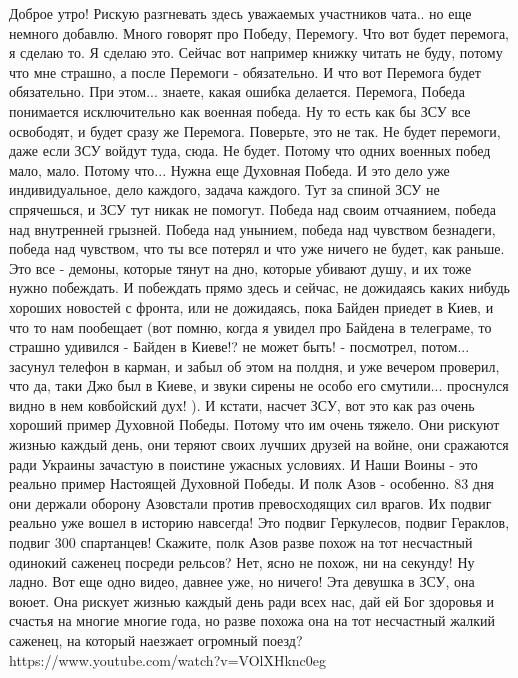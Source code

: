 Доброе утро! Рискую разгневать здесь уважаемых участников чата.. но еще немного
добавлю. Много говорят про Победу, Перемогу. Что вот будет перемога, я сделаю
то. Я сделаю это. Сейчас вот например книжку читать не буду, потому что мне
страшно, а после Перемоги - обязательно. И что вот Перемога будет обязательно.
При этом... знаете, какая ошибка делается. Перемога, Победа понимается
исключительно как военная победа. Ну то есть как бы ЗСУ все освободят, и будет
сразу же Перемога. Поверьте, это не так. Не будет перемоги, даже если ЗСУ
войдут туда, сюда. Не будет. Потому что одних военных побед мало, мало. Потому
что...  Нужна еще Духовная Победа. И это дело уже индивидуальное, дело каждого,
задача каждого. Тут за спиной ЗСУ не спрячешься, и ЗСУ тут никак не помогут.
Победа над своим отчаянием, победа над внутренней грызней. Победа над унынием,
победа над чувством безнадеги, победа над чувством, что ты все потерял и что
уже ничего не будет, как раньше. Это все - демоны, которые тянут на дно,
которые убивают душу, и их тоже нужно побеждать. И побеждать прямо здесь и
сейчас, не дожидаясь каких нибудь хороших новостей с фронта, или не дожидаясь,
пока Байден приедет в Киев, и что то нам пообещает (вот помню, когда я увидел
про Байдена в телеграме, то страшно удивился - Байден в Киеве!? не может быть!
- посмотрел, потом... засунул телефон в карман, и забыл об этом на полдня, и
уже вечером проверил, что да, таки Джо был в Киеве, и звуки сирены не особо его
смутили... проснулся видно в нем ковбойский дух! ). И кстати, насчет ЗСУ, вот
это как раз очень хороший пример Духовной Победы. Потому что им очень тяжело.
Они рискуют жизнью каждый день, они теряют своих лучших друзей на войне, они
сражаются ради Украины зачастую в поистине ужасных условиях. И Наши Воины - это
реально пример Настоящей Духовной Победы. И полк Азов - особенно. 83 дня они
держали оборону Азовстали против превосходящих сил врагов. Их подвиг реально
уже вошел в историю навсегда! Это подвиг Геркулесов, подвиг Гераклов, подвиг
300 спартанцев!  Скажите, полк Азов разве похож на тот несчастный одинокий
саженец посреди рельсов? Нет, ясно не похож, ни на секунду! Ну ладно.  Вот еще
одно видео, давнее уже, но ничего! Эта девушка в ЗСУ, она воюет. Она рискует
жизнью каждый день ради всех нас, дай ей Бог здоровья и счастья на многие
многие года, но разве похожа она на тот несчастный жалкий саженец, на который
наезжает огромный поезд? https://www.youtube.com/watch?v=VOlXHknc0eg


